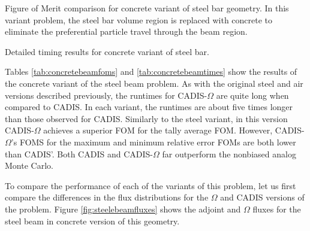 \begin{table}[h!]
  \centering
  
  \caption[Figure of Merit comparison for concrete variant of steel bar geometry.]
  {Figure of Merit comparison for concrete variant of steel bar geometry. In this
  variant problem, the steel bar volume region is replaced with concrete to
  eliminate the preferential particle travel through the beam region.}
  \label{tab:concretebeamfoms}
\end{table}

\begin{table}[h!]
  \centering
  
  \caption[Detailed timing results for concrete variant of steel bar.]
  {Detailed timing results for concrete variant of steel bar.}
  \label{tab:concretebeamtimes}
\end{table}

Tables \ref{tab:concretebeamfoms} and \ref{tab:concretebeamtimes} show the
results of the concrete variant of the steel beam problem. As with the original
steel and air versions described previously, the runtimes for CADIS-$\Omega$ are quite
long when compared to CADIS. In each variant, the runtimes are about five times
longer than those observed for CADIS. Similarly to the steel variant, in this
version CADIS-$\Omega$ achieves a superior FOM for the tally average FOM.
However, CADIS-$\Omega$'s FOMS for the maximum and minimum relative error FOMs
are both lower than CADIS'. Both CADIS and CADIS-$\Omega$ far outperform the
nonbiased analog Monte Carlo.

To compare the performance of each of the variants of this problem, let us first
compare the differences in the flux distributions for the $\Omega$ and CADIS
versions of the problem. Figure \ref{fig:steelebeamfluxes} shows the
adjoint and $\Omega$ fluxes for
the steel beam in concrete version of this geometry.

